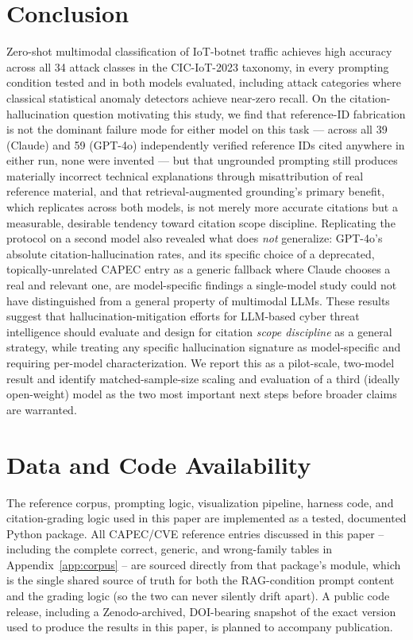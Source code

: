 \documentclass[10pt,twocolumn]{article}
\newcommand{\code}[1]{\texttt{\detokenize{#1}}}
\begin{document}
\section{Conclusion}

Zero-shot multimodal classification of IoT-botnet traffic achieves high accuracy across all 34 attack classes in the CIC-IoT-2023 taxonomy, in every prompting condition tested and in both models evaluated, including attack categories where classical statistical anomaly detectors achieve near-zero recall. On the citation-hallucination question motivating this study, we find that reference-ID fabrication is not the dominant failure mode for either model on this task --- across all 39 (Claude) and 59 (GPT-4o) independently verified reference IDs cited anywhere in either run, none were invented --- but that ungrounded prompting still produces materially incorrect technical explanations through misattribution of real reference material, and that retrieval-augmented grounding's primary benefit, which replicates across both models, is not merely more accurate citations but a measurable, desirable tendency toward citation scope discipline. Replicating the protocol on a second model also revealed what does \emph{not} generalize: GPT-4o's absolute citation-hallucination rates, and its specific choice of a deprecated, topically-unrelated CAPEC entry as a generic fallback where Claude chooses a real and relevant one, are model-specific findings a single-model study could not have distinguished from a general property of multimodal LLMs. These results suggest that hallucination-mitigation efforts for LLM-based cyber threat intelligence should evaluate and design for citation \emph{scope discipline} as a general strategy, while treating any specific hallucination signature as model-specific and requiring per-model characterization. We report this as a pilot-scale, two-model result and identify matched-sample-size scaling and evaluation of a third (ideally open-weight) model as the two most important next steps before broader claims are warranted.

\section*{Data and Code Availability}

The reference corpus, prompting logic, visualization pipeline, harness code, and citation-grading logic used in this paper are implemented as a tested, documented Python package. All CAPEC/CVE reference entries discussed in this paper -- including the complete correct, generic, and wrong-family tables in Appendix~\ref{app:corpus} -- are sourced directly from that package's \code{corpus.py} module, which is the single shared source of truth for both the RAG-condition prompt content and the grading logic (so the two can never silently drift apart). A public code release, including a Zenodo-archived, DOI-bearing snapshot of the exact version used to produce the results in this paper, is planned to accompany publication.
\end{document}
